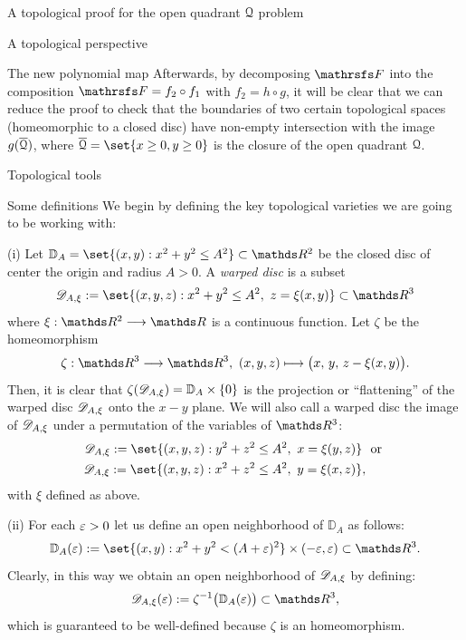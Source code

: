 \documentclass[11pt, a4paper, english, twoside, notitlepage, openright]{report}
\begin{document}
\begin{chapter}{A topological proof for the open quadrant $\mathcal{Q}$ problem}
\begin{section}{A topological perspective}
\begin{subsection}{The new polynomial map}
Afterwards, by decomposing $\FFF$ into the composition $\FFF = f_2 \circ f_1$ with $f_2 = h \circ g$, it will be clear that we can reduce the proof to check that the boundaries of two certain topological spaces (homeomorphic to a closed disc) have non-empty intersection with the image $g(\overline{\mathcal{Q}})$, where $\overline{\Qu} = \set{x \ge 0, y \ge 0}$ is the closure of the open quadrant $\mathcal{Q}$.
\end{subsection}
\end{section}
\begin{section}{Topological tools}
\begin{subsection}{Some definitions}
We begin by defining the key topological varieties we are going to be working with:
\begin{definitions}
(i) Let ${\mathbb D}_A = \set{(x,y): x^2+y^2 \le A^2} \subset \R^2$ be the closed disc of center the origin and radius $A>0$. A \textit{warped disc} is a subset 
$$\D_{A,\xi}:=\set{(x,y,z): x^2+y^2\le A^2,\ z=\xi(x,y)}\subset\R^3$$
where $\xi:\R^2\longrightarrow\R$ is a continuous function. Let $\zeta$ be the homeomorphism
$$
\zeta:\R^3\longrightarrow\R^3,\ (x,y,z)\longmapsto\big(x,\, y,\, z-\xi(x,y)\big).
$$
Then, it is clear that $\zeta(\mathscr{D}_{A,\xi}) = {\mathbb D}_A\times\{0\}$ is the projection or ``flattening'' of the warped disc $\mathscr{D}_{A,\xi}$ onto the $x-y$ plane. We will also call a warped disc the image of $\mathscr{D}_{A,\xi}$ under a permutation of the variables of $\R^3$:
\begin{equation*}
\begin{aligned}
\D_{A,\xi}:=\set{(x,y,z): y^2+z^2\le A^2,\ x=\xi(y,z)}& \ \text{ or } \\
\D_{A,\xi}:=\set{(x,y,z): x^2+z^2\le A^2,\ y=\xi(x,z)}&,
\end{aligned}
\end{equation*}
with $\xi$ defined as above.

(ii) For each $\varepsilon>0$ let us define an open neighborhood of ${\mathbb D}_A$ as follows:
$$
{\mathbb D}_A(\eps):=\set{(x,y):x^2+y^2<(A+\eps)^2}\times(-\eps,\eps)\subset\R^3.
$$ 
Clearly, in this way we obtain an open neighborhood of $\mathscr{D}_{A,\xi}$ by defining:
$$
\D_{A,\xi}(\eps):=\zeta^{-1}\big({\mathbb D}_A(\eps)\big) \subset \R^3,
$$
which is guaranteed to be well-defined because $\zeta$ is an homeomorphism.
\end{definitions}


\end{subsection}
\end{section}
\end{chapter}
\end{document}
